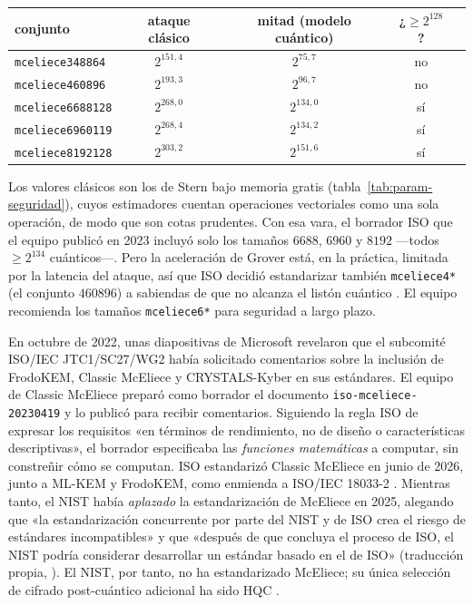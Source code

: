 \begin{center}
\small
\begin{tabular}{lcccc}
\toprule
conjunto & ataque clásico & mitad (modelo cuántico) & ¿$\ge2^{128}$?\\
\midrule
\texttt{mceliece348864} & $2^{151{,}4}$ & $2^{75{,}7}$ & no\\
\texttt{mceliece460896} & $2^{193{,}3}$ & $2^{96{,}7}$ & no\\
\texttt{mceliece6688128} & $2^{268{,}0}$ & $2^{134{,}0}$ & sí\\
\texttt{mceliece6960119} & $2^{268{,}4}$ & $2^{134{,}2}$ & sí\\
\texttt{mceliece8192128} & $2^{303{,}2}$ & $2^{151{,}6}$ & sí\\
\bottomrule
\end{tabular}
\end{center}

Los valores clásicos son los de Stern bajo memoria gratis
(tabla~\ref{tab:param-seguridad}), cuyos estimadores cuentan
operaciones vectoriales como una sola operación, de modo que son cotas
prudentes. Con esa vara, el borrador ISO que el equipo publicó en
2023 incluyó solo los tamaños $6688$, $6960$ y $8192$ ---todos
$\ge2^{134}$ cuánticos---. Pero la aceleración de Grover está, en la
práctica, limitada por la latencia del ataque, así que ISO decidió
estandarizar también \texttt{mceliece4*} (el conjunto $460896$) a
sabiendas de que no alcanza el listón cuántico
\cite{cmiso}. El equipo recomienda los tamaños
\texttt{mceliece6*} para seguridad a largo plazo.

\begin{historia}
En octubre de 2022, unas diapositivas de Microsoft revelaron que el
subcomité ISO/IEC JTC1/SC27/WG2 había solicitado comentarios sobre la
inclusión de FrodoKEM, Classic McEliece y CRYSTALS-Kyber en sus
estándares. El equipo de Classic McEliece preparó como borrador el
documento \texttt{iso-mceliece-20230419} y lo publicó para recibir
comentarios. Siguiendo la regla ISO de expresar los requisitos «en
términos de rendimiento, no de diseño o características descriptivas»,
el borrador especificaba las \emph{funciones matemáticas} a computar,
sin constreñir cómo se computan. ISO estandarizó Classic McEliece en
junio de 2026, junto a ML-KEM y FrodoKEM, como enmienda a
ISO/IEC 18033-2 \cite{cmiso}. Mientras tanto, el NIST había
\emph{aplazado} la estandarización de McEliece en 2025, alegando que
«la estandarización concurrente por parte del NIST y de ISO crea el
riesgo de estándares incompatibles» y que «después de que concluya el
proceso de ISO, el NIST podría considerar desarrollar un estándar
basado en el de ISO» (traducción propia, \cite{cmnist}). El NIST, por
tanto, no ha estandarizado McEliece; su única selección de cifrado
post-cuántico adicional ha sido HQC \cite{nist8545}.
\end{historia}


